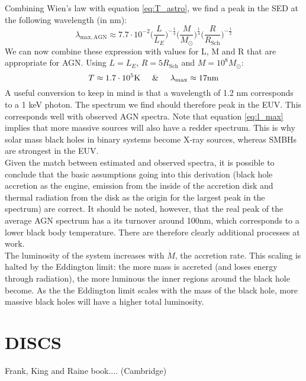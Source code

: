 \documentclass[11pt]{article}
\begin{document}
Combining Wien's law with equation \ref{eq:T_astro}, we find a peak in the SED at the following wavelength (in nm):
\begin{equation}
	\lambda_{\mathrm{max,AGN}} \approx 7.7\cdot 10^{-2}\Big(\frac{L}{L_E}\Big)^{-\frac{1}{4}}\Big(\frac{M}{M_{\odot}}\Big)^{\frac{1}{4}}\Big(\frac{R}{R_{\mathrm{Sch}}}\Big)^{-\frac{1}{2}}
	\label{eq:l_max}
\end{equation}
We can now combine these expression with values for L, M and R that are appropriate for AGN. Using $L=L_E$, $R=5R_{\mathrm{Sch}}$ and $M=10^8 M_{\odot}$:
$$
T \approx 1.7\cdot 10^5 \mathrm{K} \hspace{5mm} \& \hspace{5mm} \lambda_{\mathrm{max}} \approx 17 \mathrm{nm}
$$
A useful conversion to keep in mind is that a wavelength of 1.2 nm corresponds to a 1 keV photon. The spectrum we find should therefore peak in the EUV. This corresponds well with observed AGN spectra. Note that equation \ref{eq:l_max} implies that more massive sources will also have a redder spectrum. This is why solar mass black holes in binary systems become X-ray sources, whereas SMBHs are strongest in the EUV.\\

\noindent
Given the match between estimated and observed spectra, it is possible to conclude that the basic assumptions going into this derivation (black hole accretion as the engine, emission from the inside of the accretion disk and thermal radiation from the disk as the origin for the largest peak in the spectrum) are correct. It should be noted, however, that the real peak of the average AGN spectrum has a its turnover around 100nm, which corresponds to a lower black body temperature. There are therefore clearly additional processes at work.\\

\noindent
The luminosity of the system increases with $\dot{M}$, the accretion rate. This scaling is halted by the Eddington limit: the more mass is accreted (and loses energy through radiation), the more luminous the inner regions around the black hole become. As the the Eddington limit scales with the mass of the black hole, more massive black holes will have a higher total luminosity. 


\clearpage
\section{DISCS}
Frank, King and Raine book.... 
(Cambridge) 
\end{document}

